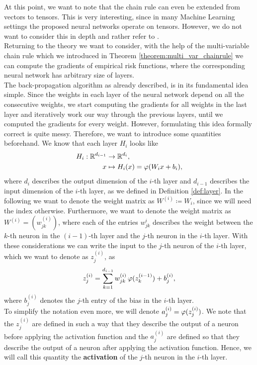 At this point, we want to note that the chain rule can even be extended from vectors to tensors. This is very interesting, since in many Machine Learning settings the proposed neural networks operate on tensors. However, we do not want to consider this in depth and rather refer to \cite[Chapter~6.5.2]{goodfellow2016deep}.\\
Returning to the theory we want to consider, with the help of the multi-variable chain rule which we introduced in Theorem \ref{theorem:multi_var_chainrule} we can compute the gradients of empirical risk functions, where the corresponding neural network has arbitrary size of layers.\\
The back-propagation algorithm as already described, is in its fundamental idea simple. Since the weights in each layer of the neural network depend on all the consecutive weights, we start computing the gradients for all weights in the last layer and iteratively work our way through the previous layers, until we computed the gradients for every weight. However, formulating this idea formally correct is quite messy. Therefore, we want to introduce some quantities beforehand. We know that each layer $H_i$ looks like
\begin{align*}
H_i: \operatorname{\mathbb{R}}^{d_{i-1}} &\to \operatorname{\mathbb{R}}^{d_{i}},\\
x &\mapsto H_i(x) = \operatorname{\varphi}(W_ix + b_i),
\end{align*}
where $d_i$ describes the output dimension of the $i$-th layer and $d_{i-1}$ describes the input dimension of the $i$-th layer, as we defined in Definition \ref{def:layer}. In the following we want to denote the weight matrix as $W^{(i)}\coloneqq W_i$, since we will need the index otherwise. Furthermore, we want to denote the weight matrix as $W^{(i)} = (w^{(i)}_{jk})$, where each of the entries $w^{i}_{jk}$ describes the weight between the $k$-th neuron in the $(i-1)$-th layer and the $j$-th neuron in the $i$-th layer. With these considerations we can write the input to the $j$-th neuron of the $i$-th layer, which we want to denote as $z_{j}^{(i)}$, as
\begin{align*}
z_{j}^{(i)} = \sum_{k=1}^{d_{i-1}} w^{(i)}_{jk} \operatorname{\varphi} (z_{k}^{(i-1)}) + b_j^{(i)},
\end{align*}
where $b_j^{(i)}$ denotes the $j$-th entry of the bias in the $i$-th layer.\\
To simplify the notation even more, we will denote $a_{j}^{(i)} = \operatorname{\varphi} (z_{j}^{(i)})$. We note that the $z_{j}^{(i)}$ are defined in such a way that they describe the output of a neuron before applying the activation function and the $a_{j}^{(i)}$ are defined so that they describe the output of a neuron after applying the activation function. Hence, we will call this quantity the \textbf{activation} of the $j$-th neuron in the $i$-th layer.\\
